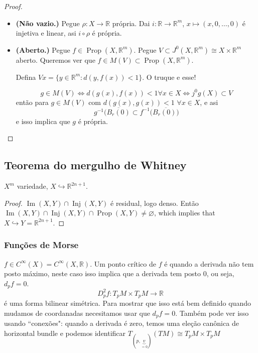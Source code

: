 \begin{proof}\leavevmode
\begin{itemize}
\item \textbf{(Não vazio.)} Pegue \(\rho:X \to \mathbb{R}\) própria. Dai \(i:\mathbb{R} \to \mathbb{R}^m\), \(x \mapsto (x,0,\ldots,0)\) é injetiva e linear, asi \(i \circ \rho\) é própria.

\item \textbf{(Aberto.)} Pegue \(f \in \operatorname{Pr o p}(X,\mathbb{R}^m)\). Pegue \(V \subset J^0(X,\mathbb{R}^m) \cong X \times \mathbb{R}^m\) aberto. Queremos ver que \(f \in M(V) \subset \operatorname{ Pr o p}(X,\mathbb{R}^m)\).

	Defina \(Vx=\{y \in \mathbb{R}^m: d(y,f(x))<1\}.\) O truque e esse!

	\[g \in M(V) \iff d (g(x),f(x))<1 \forall  x \in X \iff j^0 g(X) \subset V\]
	então para \(g \in M(V)\) com \(d(g(x),g(x))<1\)  \(\forall  x \in X\), e asi
	\[g^{-1}(\overline{B_r(0)}\subset f^{-1}(\overline{B_r(0))}\]
	e isso implica que \(g\) é própria.
\end{itemize}
\end{proof}

\subsection{Teorema do mergulho de Whitney}

\begin{coro}\leavevmode
\(X^m\) variedade, \(X \hookrightarrow  \mathbb{R}^{2n+1}\).
\end{coro}

\begin{proof}\leavevmode
\(\operatorname{Im}(X,Y) \cap \operatorname{Inj}(X,Y)\) é residual, logo denso. Então \(\operatorname{Im}(X,Y) \cap \operatorname{Inj}(X,Y) \cap \operatorname{Pr o p}(X,Y) \neq  \varnothing\), which implies that \(X \hookrightarrow  Y=\mathbb{R}^{2n+1}\).
\end{proof}

\subsubsection{Funções de Morse}

\begin{defn}\leavevmode
\( f \in C^\infty(X)=C^\infty(X,\mathbb{R})\). Um ponto crítico de $f$ é quando a derivada não tem posto máximo, neste caso isso implica que a derivada tem posto 0, ou seja, \(d_pf=0\).
 \[D^2_pf:T_pM \times T_pM \to \mathbb{R}\]
 é uma forma bilinear simétrica. Para mostrar que isso está bem definido quando mudamos de coordanadas necesitamos usar que \(d_pf=0\). Também pode ver isso usando  ``conexões": quando a derivada é zero, temos uma eleção canônica de horizontal bundle e podemos identificar \(T_{(p,\underbrace{v}_{=0})}(TM) \cong T_pM \times T_pM\)
\end{defn}

